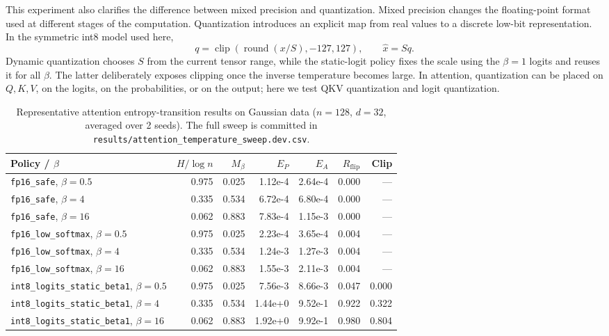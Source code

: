 This experiment also clarifies the difference between mixed precision and quantization. Mixed precision changes the floating-point format used at different stages of the computation. Quantization introduces an explicit map from real values to a discrete low-bit representation. In the symmetric int8 model used here,
\[
    q = \operatorname{clip}(\operatorname{round}(x/S), -127, 127),
    \qquad
    \widehat x = S q.
\]
Dynamic quantization chooses $S$ from the current tensor range, while the static-logit policy fixes the scale using the $\beta=1$ logits and reuses it for all $\beta$. The latter deliberately exposes clipping once the inverse temperature becomes large. In attention, quantization can be placed on $Q,K,V$, on the logits, on the probabilities, or on the output; here we test QKV quantization and logit quantization.

\begin{table}[ht]
\centering
\caption{Representative attention entropy-transition results on Gaussian data ($n=128$, $d=32$, averaged over 2 seeds). The full sweep is committed in \texttt{results/attention\_temperature\_sweep.dev.csv}.}
\label{tab:temperature}
\small
\begin{tabular}{l rrrrrr}
\toprule
Policy / $\beta$ & $H/\log n$ & $M_\beta$ & $E_P$ & $E_A$ & $R_{\mathrm{flip}}$ & Clip \\
\midrule
\texttt{fp16\_safe}, $\beta=0.5$  & 0.975 & 0.025 & 1.12e-4 & 2.64e-4 & 0.000 & --- \\
\texttt{fp16\_safe}, $\beta=4$    & 0.335 & 0.534 & 6.72e-4 & 6.80e-4 & 0.000 & --- \\
\texttt{fp16\_safe}, $\beta=16$   & 0.062 & 0.883 & 7.83e-4 & 1.15e-3 & 0.000 & --- \\
\midrule
\texttt{fp16\_low\_softmax}, $\beta=0.5$ & 0.975 & 0.025 & 2.23e-4 & 3.65e-4 & 0.004 & --- \\
\texttt{fp16\_low\_softmax}, $\beta=4$   & 0.335 & 0.534 & 1.24e-3 & 1.27e-3 & 0.004 & --- \\
\texttt{fp16\_low\_softmax}, $\beta=16$  & 0.062 & 0.883 & 1.55e-3 & 2.11e-3 & 0.004 & --- \\
\midrule
\texttt{int8\_logits\_static\_beta1}, $\beta=0.5$ & 0.975 & 0.025 & 7.56e-3 & 8.66e-3 & 0.047 & 0.000 \\
\texttt{int8\_logits\_static\_beta1}, $\beta=4$   & 0.335 & 0.534 & 1.44e+0 & 9.52e-1 & 0.922 & 0.322 \\
\texttt{int8\_logits\_static\_beta1}, $\beta=16$  & 0.062 & 0.883 & 1.92e+0 & 9.92e-1 & 0.980 & 0.804 \\
\bottomrule
\end{tabular}
\end{table}

